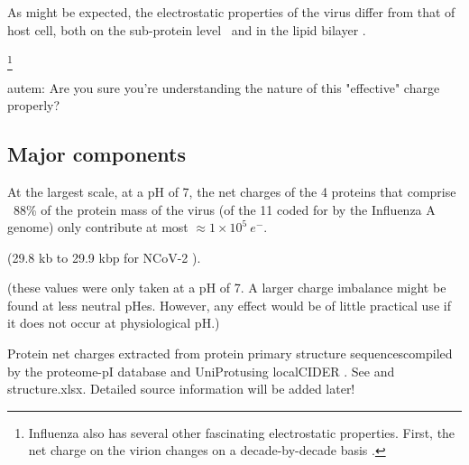 \documentclass[paper.tex]{subfiles}
\begin{document}
As might be expected, the electrostatic properties of the virus differ from that of host cell, both on the sub-protein level\cite{Icosahedral2019} \footnotemark \ and in the lipid bilayer \cite{Lipid2015} \footnotemark. 



\footnote{Influenza also has several other fascinating electrostatic properties. First, the net charge on the virion changes on a decade-by-decade basis \cite{Dynamics2010}. }

\begin{autem}
	autem: Are you sure you're understanding the nature of this "effective" charge properly?
\end{autem}

\subsection{Major components}

At the largest scale, at a pH of 7, the net charges of the 4 proteins that comprise ~88\% of the protein mass\cite{Quantitative1981} of the virus (of the 11 coded for by the Influenza A genome) only contribute at most  $\approx 1 \times 10^5\  e^-$.

(29.8 kb to 29.9 kbp for NCoV-2 \cite{Genomic2020}).

(these values were only taken at a pH of 7. A larger charge imbalance might be found at less neutral pHes. However, any effect would be of little practical use if it does not occur at physiological pH.)

\begin{sidenote}
Protein net charges extracted from protein primary structure sequences\footnotemark compiled by the proteome-pI database \cite{ProteomepI2017} and UniProt\footnotemark using localCIDER \cite{CIDER2017}. See  and structure.xlsx. Detailed source information will be added later!
\end{sidenote}
\end{document}
